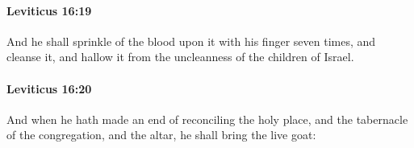 		\paragraph{Leviticus 16:19} %
			\label{LEVITICUS-16-19}

			And he shall sprinkle of the blood upon it with his finger seven times, and cleanse it, and hallow it from the uncleanness of the children of Israel.


		\paragraph{Leviticus 16:20} %
			\label{LEVITICUS-16-20}

			And when he hath made an end of reconciling the holy place, and the tabernacle of the congregation, and the altar, he shall bring the live goat:


